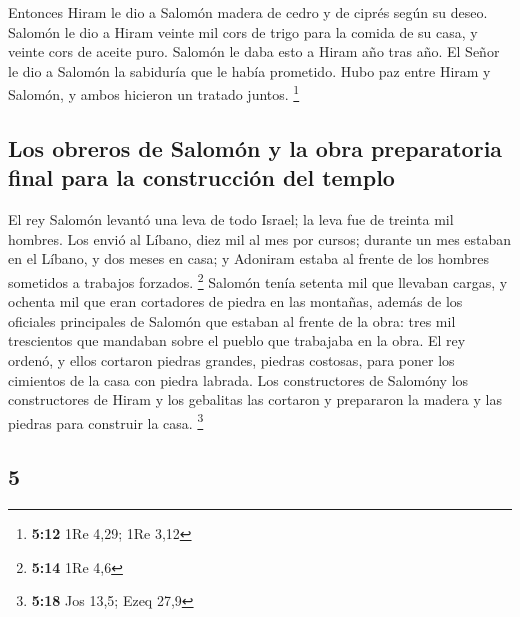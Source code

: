 \begin{paracol}{2}
 Entonces Hiram le dio a Salomón madera de cedro y de
ciprés según su deseo.  Salomón le dio a Hiram veinte mil
cors de trigo para la comida de su casa, y veinte cors de aceite puro.
Salomón le daba esto a Hiram año tras año.  El Señor le
dio a Salomón la sabiduría que le había prometido. Hubo paz entre Hiram
y Salomón, y ambos hicieron un tratado juntos. \footnote{\textbf{5:12}
  1Re 4,29; 1Re 3,12}

\hypertarget{los-obreros-de-salomuxf3n-y-la-obra-preparatoria-final-para-la-construcciuxf3n-del-templo}{%
\subsection{Los obreros de Salomón y la obra preparatoria final para la
construcción del
templo}\label{los-obreros-de-salomuxf3n-y-la-obra-preparatoria-final-para-la-construcciuxf3n-del-templo}}

 El rey Salomón levantó una leva de todo Israel; la leva
fue de treinta mil hombres.  Los envió al Líbano, diez
mil al mes por cursos; durante un mes estaban en el Líbano, y dos meses
en casa; y Adoniram estaba al frente de los hombres sometidos a trabajos
forzados. \footnote{\textbf{5:14} 1Re 4,6}  Salomón tenía
setenta mil que llevaban cargas, y ochenta mil que eran cortadores de
piedra en las montañas,  además de los oficiales
principales de Salomón que estaban al frente de la obra: tres mil
trescientos que mandaban sobre el pueblo que trabajaba en la obra.
 El rey ordenó, y ellos cortaron piedras grandes, piedras
costosas, para poner los cimientos de la casa con piedra labrada.
 Los constructores de Salomóny los constructores de Hiram
y los gebalitas las cortaron y prepararon la madera y las piedras para
construir la casa. \footnote{\textbf{5:18} Jos 13,5; Ezeq 27,9}

\switchcolumn
\begin{otherlanguage}{english}

\hypertarget{section-9}{%
\section{5}\label{section-9}}


\end{otherlanguage}
\end{paracol}
